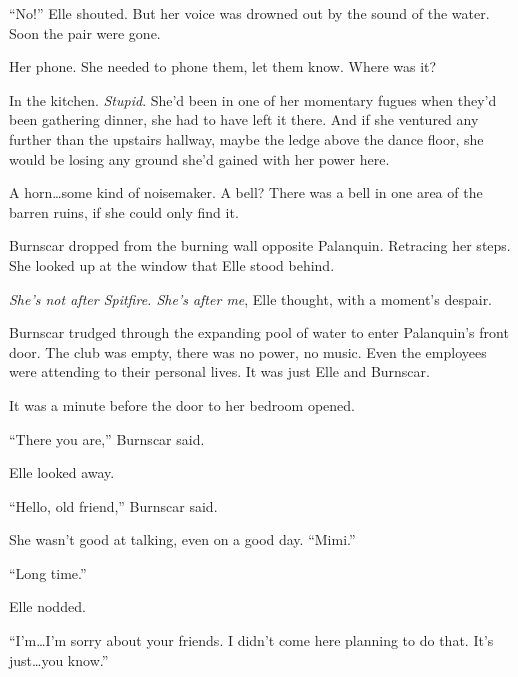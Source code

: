 ``No!'' Elle shouted.  But her voice was drowned out by the sound of the water.  Soon the pair were gone.



Her phone.  She needed to phone them, let them know.  Where was it?



In the kitchen.  \emph{Stupid}.  She'd been in one of her momentary fugues when they'd been gathering dinner, she had to have left it there.  And if she ventured any further than the upstairs hallway, maybe the ledge above the dance floor, she would be losing any ground she'd gained with her power here.



A horn\ldots some kind of noisemaker.  A bell?  There was a bell in one area of the barren ruins, if she could only find it.



Burnscar dropped from the burning wall opposite Palanquin.  Retracing her steps.  She looked up at the window that Elle stood behind.



\emph{She's not after Spitfire.  She's after me}, Elle thought, with a moment's despair.



Burnscar trudged through the expanding pool of water to enter Palanquin's front door.  The club was empty, there was no power, no music.  Even the employees were attending to their personal lives.  It was just Elle and Burnscar.



It was a minute before the door to her bedroom opened.



``There you are,'' Burnscar said.



Elle looked away.



``Hello, old friend,'' Burnscar said.



She wasn't good at talking, even on a good day.  ``Mimi.''



``Long time.''



Elle nodded.



``I'm\ldots I'm sorry about your friends.  I didn't come here planning to do that.  It's just\ldots you know.''



